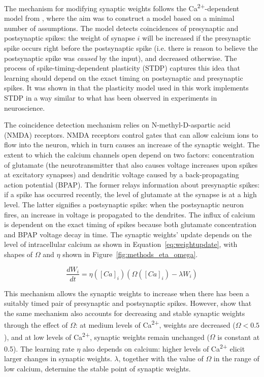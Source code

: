 \documentclass[a4paper,12pt]{report}
\theoremstyle{definition}
\begin{document}
The mechanism for modifying synaptic weights follows the Ca\textsuperscript{2+}-dependent model from \cite{shouval2002unified}, where the aim was to construct a model based on a minimal number of assumptions. The model detects coincidences of presynaptic and postsynaptic spikes: the weight of synapse $i$ will be increased if the presynaptic spike occurs right before the postsynaptic spike (i.e. there is reason to believe the postsynaptic spike was \emph{caused} by the input), and decreased otherwise. The process of spike-timing-dependent plasticity (STDP) captures this idea that learning should depend on the exact timing on postsynaptic and presynaptic spikes. It was shown in \cite{shouval2002unified} that the plasticity model used in this work implements STDP in a way similar to what has been observed in experiments in neuroscience.

The coincidence detection mechanism relies on N-methyl-D-aspartic acid (NMDA) receptors. NMDA receptors control gates that can allow calcium ions to flow into the neuron, which in turn causes an increase of the synaptic weight. The extent to which the calcium channels open depend on two factors: concentration of glutamate (the neurotransmitter that also causes voltage increases upon spikes at excitatory synapses) and dendritic voltage caused by a back-propagating action potential (BPAP). The former relays information about presynaptic spikes: if a spike has occurred recently, the level of glutamate at the synapse is at a high level. The latter signifies a postsynaptic spike: when the postsynaptic neuron fires, an increase in voltage is propagated to the dendrites. The influx of calcium is dependent on the exact timing of spikes because both glutamate concentration and BPAP voltage decay in time. The synaptic weights' update depends on the level of intracellular calcium as shown in Equation~\ref{eq:weightupdate}, with shapes of $\Omega$ and $\eta$ shown in Figure~\ref{fig:methods_eta_omega}.

\begin{equation}
\frac{dW_i}{dt} = \eta ([Ca]_i) (\Omega([Ca]_i) - \lambda W_i)
\label{eq:weightupdate}
\end{equation}

This mechanism allows the synaptic weights to increase when there has been a suitably timed pair of presynaptic and postsynaptic spikes. However, \cite{shouval2002unified} show that the same mechanism also accounts for decreasing and stable synaptic weights through the effect of $\Omega$: at medium levels of Ca\textsuperscript{2+}, weights are decreased ($\Omega<0.5$), and at low levels of Ca\textsuperscript{2+}, synaptic weights remain unchanged ($\Omega$ is constant at 0.5). The learning rate $\eta$ also depends on calcium: higher levels of Ca\textsuperscript{2+} elicit larger changes in synaptic weights. $\lambda$, together with the value of $\Omega$ in the range of low calcium, determine the stable point of synaptic weights.
\end{document}
